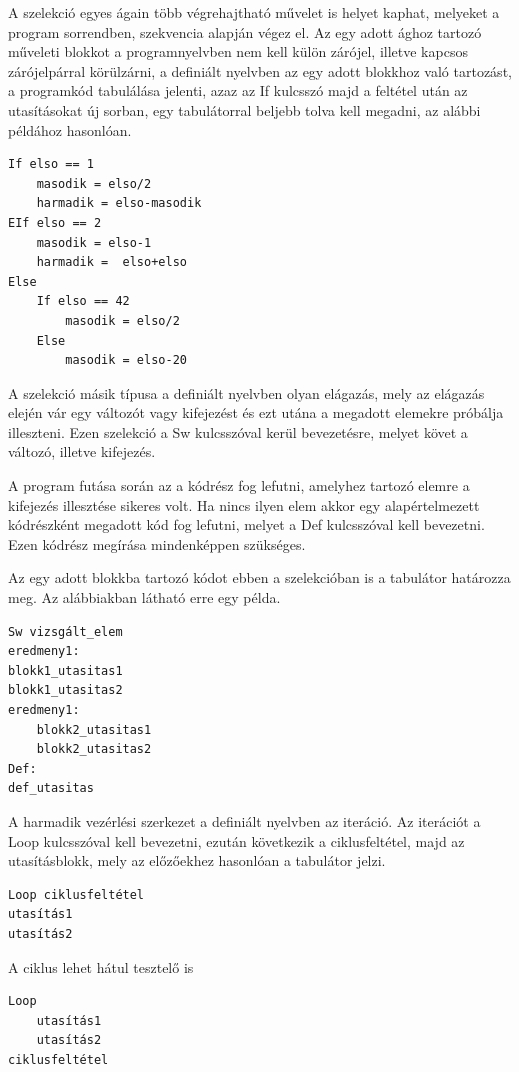 A szelekció egyes ágain több végrehajtható művelet is helyet kaphat, melyeket a program sorrendben, szekvencia alapján végez el. Az egy adott ághoz tartozó műveleti blokkot a programnyelvben nem kell külön zárójel, illetve kapcsos zárójelpárral körülzárni, a definiált nyelvben az egy adott blokkhoz való tartozást, a programkód tabulálása jelenti, azaz az If kulcsszó majd a feltétel után az utasításokat új sorban, egy tabulátorral beljebb tolva kell megadni, az alábbi példához hasonlóan.

\begin{verbatim}
If elso == 1
	masodik = elso/2
	harmadik = elso-masodik
EIf elso == 2
	masodik = elso-1
	harmadik =  elso+elso
Else
	If elso == 42
		masodik = elso/2
	Else
		masodik = elso-20
\end{verbatim}

A szelekció másik típusa a definiált nyelvben olyan elágazás, mely az elágazás elején vár egy változót vagy kifejezést és ezt utána a megadott elemekre próbálja illeszteni. Ezen szelekció a Sw kulcsszóval kerül bevezetésre, melyet követ a változó, illetve kifejezés.

A program futása során az a kódrész fog lefutni, amelyhez tartozó elemre a kifejezés illesztése sikeres volt. Ha nincs ilyen elem akkor egy alapértelmezett kódrészként megadott kód fog lefutni, melyet a Def kulcsszóval kell bevezetni. Ezen kódrész megírása mindenképpen szükséges.

Az egy adott blokkba tartozó kódot ebben a szelekcióban is a tabulátor határozza meg. Az alábbiakban látható erre egy példa.

\begin{verbatim}
Sw vizsgált_elem
eredmeny1:
blokk1_utasitas1
blokk1_utasitas2
eredmeny1:
	blokk2_utasitas1
	blokk2_utasitas2
Def:
def_utasitas
\end{verbatim}

A harmadik vezérlési szerkezet a definiált nyelvben az iteráció. Az iterációt a Loop kulcsszóval kell bevezetni, ezután következik a ciklusfeltétel, majd az utasításblokk, mely az előzőekhez hasonlóan a tabulátor jelzi.

\begin{verbatim}
Loop ciklusfeltétel
utasítás1
utasítás2
\end{verbatim}

A ciklus lehet hátul tesztelő is
\begin{verbatim}
Loop
	utasítás1
	utasítás2
ciklusfeltétel
\end{verbatim}

